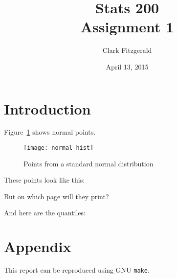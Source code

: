 \documentclass[12pt]{article}
\begin{document}
\title{Stats 200
    \\ Assignment 1}
\date{April 13, 2015}
\author{Clark Fitzgerald}
\maketitle

\newpage

\section{Introduction}

Figure~\ref{fig:normal_hist} shows normal points.

\begin{figure}
    \centering
    \texttt{[image: normal\_hist]}
    \caption{Points from a standard normal distribution}
    \label{fig:normal_hist}
\end{figure}

These points look like this:



But on which page will they print?

And here are the quantiles:

\begin{centering}

\end{centering}


\newpage



\section{Appendix}

This report can be reproduced using GNU \texttt{make}.


\end{document}
